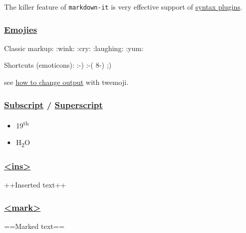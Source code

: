 \documentclass[
  paper=a4,
  ,captions=tableheading
]{scrartcl}
\providecommand{\tightlist}{%
  \setlength{\itemsep}{0pt}\setlength{\parskip}{0pt}}
\renewenvironment{quote}{\begin{customblockquote}\list{}{\rightmargin=0em\leftmargin=0em}%
\item\relax\color{blockquote-text}\ignorespaces}{\unskip\unskip\endlist\end{customblockquote}}
\begin{document}
The killer feature of
\colorbox{inlinecode-bgcolor}{\lstinline{markdown-it}} is very effective
support of
\href{https://www.npmjs.org/browse/keyword/markdown-it-plugin}{syntax
plugins}.

\hypertarget{emojies}{%
\subsubsection{\texorpdfstring{\href{https://github.com/markdown-it/markdown-it-emoji}{Emojies}}{Emojies}}\label{emojies}}

\begin{quote}
Classic markup: :wink: :cry: :laughing: :yum:

Shortcuts (emoticons): :-) :-( 8-) ;)
\end{quote}

see
\href{https://github.com/markdown-it/markdown-it-emoji\#change-output}{how
to change output} with twemoji.

\hypertarget{subscript-superscript}{%
\subsubsection{\texorpdfstring{\href{https://github.com/markdown-it/markdown-it-sub}{Subscript}
/
\href{https://github.com/markdown-it/markdown-it-sup}{Superscript}}{Subscript / Superscript}}\label{subscript-superscript}}

\begin{itemize}
\tightlist
\item
  19\textsuperscript{th}
\item
  H\textsubscript{2}O
\end{itemize}

\hypertarget{ins}{%
\subsubsection{\texorpdfstring{\href{https://github.com/markdown-it/markdown-it-ins}{\textless ins\textgreater{}}}{\textless ins\textgreater{}}}\label{ins}}

++Inserted text++

\hypertarget{mark}{%
\subsubsection{\texorpdfstring{\href{https://github.com/markdown-it/markdown-it-mark}{\textless mark\textgreater{}}}{\textless mark\textgreater{}}}\label{mark}}

==Marked text==
\end{document}
